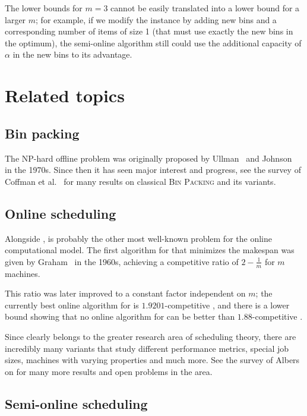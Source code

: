 The lower bounds for $m=3$ cannot be easily translated into a lower
bound for a larger $m$; for example, if we modify the instance by
adding new bins and a corresponding number of items of size 1 (that
must use exactly the new bins in the optimum), the semi-online
algorithm still could use the additional capacity of $\alpha$ in the
new bins to its advantage.

\section{Related topics}\label{sec:1:related}

\subsection{Bin packing}\label{sec:1:binpackinghistory}

The NP-hard offline problem \binpacking was originally proposed by
Ullman~\cite{ullman71} and Johnson~\cite{johnson73} in the
1970s. Since then it has seen major interest and progress, see the
survey of Coffman et al.~\cite{coffman13} for many results on
classical \textsc{Bin Packing} and its variants. 

\subsection{Online scheduling}\label{sec:1:schedulinghistory}

Alongside \binpacking, \scheduling is probably the other most
well-known problem for the online computational model. The first
algorithm for \scheduling that minimizes the makespan was given by
Graham~\cite{graham66} in the 1960s, achieving a competitive ratio of
$2-\frac{1}{m}$ for $m$ machines.

This ratio was later improved to a constant factor independent on $m$;
the currently best online algorithm for \scheduling is
$1.9201$-competitive \cite{fleischerwahl}, and there is a lower bound
showing that no online algorithm for \scheduling can be better than
$1.88$-competitive \cite{rudinthesis}.

Since \scheduling clearly belongs to the greater research area of
scheduling theory, there are incredibly many variants that study
different performance metrics, special job sizes, machines with
varying properties and much more. See the survey of Albers
\cite{alberssurvey} on \scheduling for many more results and open
problems in the area.

\subsection{Semi-online scheduling}

